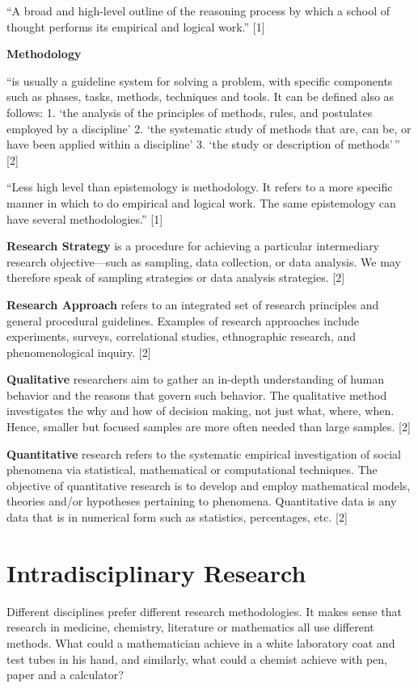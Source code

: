 ``A broad and high-level outline of the reasoning process by which a school of thought performs its empirical and logical work.'' [1]

\textbf{Methodology}

``is usually a guideline system for solving a problem, with specific components such as phases, tasks, methods, techniques and tools. It can be defined also as follows: 1.	`the analysis of the principles of methods, rules, and postulates employed by a discipline' 2.	`the systematic study of methods that are, can be, or have been applied within a discipline' 3.	`the study or description of methods'\,'' [2]

``Less high level than epistemology is methodology. It refers to a more specific manner in which to do empirical and logical work. The same epistemology can have several methodologies.'' [1]

\textbf{Research Strategy}
is a procedure for achieving a particular intermediary research objective—such as sampling, data collection, or data analysis. We may therefore speak of sampling strategies or data analysis strategies. [2]

\textbf{Research Approach}
refers to an integrated set of research principles and general procedural guidelines. Examples of research approaches include experiments, surveys, correlational studies, ethnographic research, and phenomenological inquiry. [2]

\textbf{Qualitative}
researchers aim to gather an in-depth understanding of human behavior and the reasons that govern such behavior. The qualitative method investigates the why and how of decision making, not just what, where, when. Hence, smaller but focused samples are more often needed than large samples. [2]

\textbf{Quantitative}
research refers to the systematic empirical investigation of social phenomena via statistical, mathematical or computational techniques. The objective of quantitative research is to develop and employ mathematical models, theories and/or hypotheses pertaining to phenomena. Quantitative data is any data that is in numerical form such as statistics, percentages, etc. [2]


\section{Intradisciplinary Research}

Different disciplines prefer different research methodologies. It makes sense that research in medicine, chemistry, literature or mathematics all use different methods. What could a mathematician achieve in a white laboratory coat and test tubes in his hand, and similarly, what could a chemist achieve with pen, paper and a calculator?

